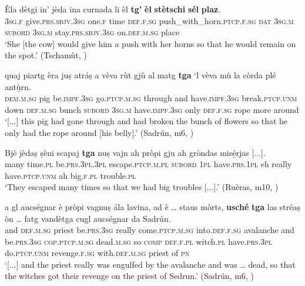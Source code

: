 \ea
\label{ex:consec1}
\gll  Èla dètgi in' jèda ina curnada li èl \textbf{tg’} \textbf{èl} \textbf{stètschi} \textbf{sél} \textbf{plaz}.\\
\textsc{3sg.f} give.\textsc{prs.sbjv.3sg} one.\textsc{f} time \textsc{def.f.sg} push\_with\_horn.\textsc{ptcp.f.sg} \textsc{dat} \textsc{3sg.m} \textsc{subord} \textsc{3sg.m} stay.\textsc{prs.sbjv.3sg} on.\textsc{def.m.sg} place \\
\glt `She [the cow] would give him a push with her horns so that he would remain on the spot.' (Tschamùt, \citealt[20]{Büchli1966})
\z

\ea
\label{ex:consec2}
	\gll    [...] quaj piartg èra juṣ atráṣ a vèva rùt gjù al matg \textbf{tga} `l vèva mù la còrda plé antù̱rn.\\
{} \textsc{dem.m.sg} pig be.\textsc{impf.3sg} go.\textsc{ptcp.m.sg} through and have.\textsc{impf.3sg} break.\textsc{ptcp.unm} down \textsc{def.m.sg} bunch  \textsc{subord} \textsc{3sg.m} have.\textsc{impf.3sg} only \textsc{def.f.sg} rope more around\\
\glt `[...] this pig had gone through and had broken the bunch of flowers so that he only had the rope around [his belly].' (Sadrún, m6, )
\z

\ea
\label{ex:consec3}
\gll  Bjè jèdaṣ ṣèni scapaj \textbf{tga} nuṣ vajn ah pròpi gju ah gròndas misé̱rjas [...].\\
many time.\textsc{pl} be.\textsc{prs.3pl.3pl} escape.\textsc{ptcp.m.pl} \textsc{subord} \textsc{1pl}   have.\textsc{prs.1pl} eh really have.\textsc{ptcp.unm} ah big.\textsc{f.pl} trouble.\textsc{pl}\\
\glt `They escaped many times so that we had big troubles [...].' (Ruèras, m10, )
\z

\ea
\label{ex:consec5}
\gll    [...] a gl aucségnar è pròpi vagnuṣ ála lavina, ad è … staus mòrts, \textbf{usché} \textbf{tga} las stréaṣ òn … fatg vandètga cugl aucségnar da Sadrún.\\
{} and \textsc{def.m.sg} priest be.\textsc{prs.3sg} really come.\textsc{ptcp.m.sg} into.\textsc{def.f.sg} avalanche and be.\textsc{prs.3sg} {} \textsc{cop.ptcp.m.sg} dead.\textsc{m.sg} so \textsc{comp} \textsc{def.f.pl} witch.\textsc{pl} have.\textsc{prs.3pl} {} do.\textsc{ptcp.unm} revenge.\textsc{f.sg} with.\textsc{def.m.sg} priest of \textsc{pn}\\
\glt `[...] and the priest really was engulfed by the avalanche and was … dead, so that the witches got their revenge on the priest of Sedrun.' (Sadrún, m6, )
\z



